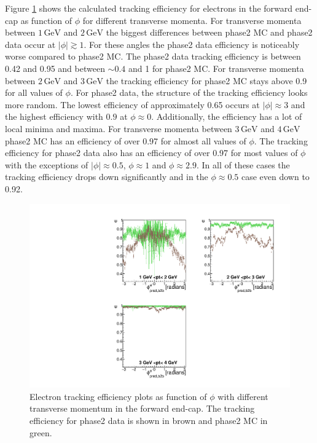 \documentclass[a4paper,11pt,twosided,final,german,openbib,pdftex,listof=totoc,bibliography=totoc]{scrbook}
\begin{document}
Figure \ref{plt:xPtMPhiemFC} shows the calculated tracking efficiency for electrons in the forward end-cap as function of $\phi$ for different transverse momenta. 
For transverse momenta between $1\,\textrm{GeV}$ and $2\,\textrm{GeV}$ the biggest differences between phase2 MC and phase2 data occur at $|\phi| \gtrsim 1$. For these angles the phase2 data efficiency is noticeably worse compared to phase2 MC. The phase2 data tracking efficiency is between 0.42 and 0.95 and between $\sim 0.4$ and 1 for phase2 MC. 
For transverse momenta between $2\,\textrm{GeV}$ and $3\,\textrm{GeV}$ the tracking efficiency for phase2 MC stays above 0.9 for all values of $\phi$. For phase2 data, the structure of the tracking efficiency looks more random. The lowest efficiency of approximately 0.65 occurs at $|\phi| \approx 3$ and the highest efficiency with $0.9$ at $\phi \approx 0$. Additionally, the efficiency has a lot of local minima and maxima. 
For transverse momenta between $3\,\textrm{GeV}$ and $4\,\textrm{GeV}$ phase2 MC has an efficiency of over 0.97 for almost all values of $\phi$. The tracking efficiency for phase2 data also has an efficiency of over 0.97 for most values of $\phi$ with the exceptions of $|\phi| \approx 0.5$, $\phi  \approx 1$ and $\phi \approx 2.9$. In all of these cases the tracking efficiency drops down significantly and in the $\phi \approx 0.5$ case even down to 0.92.

\begin{figure}[!htbp]
	\centering
	\includegraphics[width=\textwidth]{Plots/master/xPtMPhiemFC}
	\caption[Transverse Momentum $\phi$ Electron Forward End-Cap Efficiency Phase2]{Electron tracking efficiency plots as function of $\phi$ with different transverse momentum in the forward end-cap. The tracking efficiency for phase2 data is shown in brown and phase2 MC in green.
		\label{plt:xPtMPhiemFC}}
\end{figure}
\end{document}
